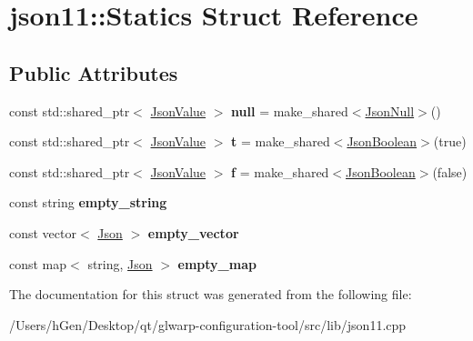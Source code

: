 \hypertarget{structjson11_1_1_statics}{}\section{json11\+:\+:Statics Struct Reference}
\label{structjson11_1_1_statics}
\subsection*{Public Attributes}
\begin{DoxyCompactItemize}
\item 
\mbox{\label{structjson11_1_1_statics_a930694498652f9d366e4bc1d6470ab5e}} 
const std\+::shared\+\_\+ptr$<$ \mbox{\hyperlink{classjson11_1_1_json_value}{Json\+Value}} $>$ {\bfseries null} = make\+\_\+shared$<$\mbox{\hyperlink{classjson11_1_1_json_null}{Json\+Null}}$>$()
\item 
\mbox{\label{structjson11_1_1_statics_ab1bbd3877a4352e4844fe8f93560b504}} 
const std\+::shared\+\_\+ptr$<$ \mbox{\hyperlink{classjson11_1_1_json_value}{Json\+Value}} $>$ {\bfseries t} = make\+\_\+shared$<$\mbox{\hyperlink{classjson11_1_1_json_boolean}{Json\+Boolean}}$>$(true)
\item 
\mbox{\label{structjson11_1_1_statics_ad1f17475577889a91affc8b988c29ab7}} 
const std\+::shared\+\_\+ptr$<$ \mbox{\hyperlink{classjson11_1_1_json_value}{Json\+Value}} $>$ {\bfseries f} = make\+\_\+shared$<$\mbox{\hyperlink{classjson11_1_1_json_boolean}{Json\+Boolean}}$>$(false)
\item 
\mbox{\label{structjson11_1_1_statics_ae9f7342466fe62de44d9e54405dbc3b0}} 
const string {\bfseries empty\+\_\+string}
\item 
\mbox{\label{structjson11_1_1_statics_af68a2346b29d00fe7b24c446d1b01ece}} 
const vector$<$ \mbox{\hyperlink{classjson11_1_1_json}{Json}} $>$ {\bfseries empty\+\_\+vector}
\item 
\mbox{\label{structjson11_1_1_statics_a86ae28f05ba91b6b6625e59c21089bfa}} 
const map$<$ string, \mbox{\hyperlink{classjson11_1_1_json}{Json}} $>$ {\bfseries empty\+\_\+map}
\end{DoxyCompactItemize}


The documentation for this struct was generated from the following file\+:\begin{DoxyCompactItemize}
\item 
/\+Users/h\+Gen/\+Desktop/qt/glwarp-\/configuration-\/tool/src/lib/json11.\+cpp\end{DoxyCompactItemize}
